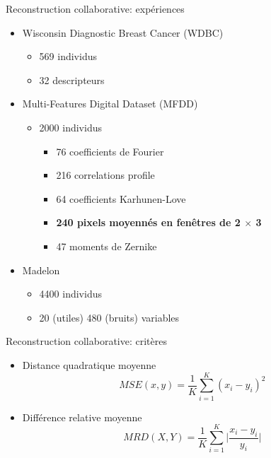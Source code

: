 \documentclass[hyperref={pdfpagelabels=false}]{beamer}
\begin{document}
    \begin{frame}{Reconstruction collaborative: expériences}
        \begin{itemize}
            \item Wisconsin Diagnostic Breast Cancer (WDBC)
                \begin{itemize}
                    \item 569 individus
                    \item 32 descripteurs
                \end{itemize}
            \item Multi-Features Digital Dataset (MFDD)
                \begin{itemize}
                    \item 2000 individus
                    \begin{itemize}
                        \item 76 coefficients de Fourier
                        \item 216 correlations profile
                        \item 64 coefficients Karhunen-Love
                        \item\textbf{240 pixels moyennés en fenêtres de 2 
                            $\times$ 3}
                        \item 47 moments de Zernike
                    \end{itemize}
                \end{itemize}
            \item Madelon
                \begin{itemize}
                    \item 4400 individus
                    \item 20 (utiles) 480 (bruits) variables
                \end{itemize}
        \end{itemize}
    \end{frame}

    \begin{frame}{Reconstruction collaborative: critères}
        \begin{itemize}
            \item Distance quadratique moyenne
                \begin{equation*}
                    MSE(x, y) = \frac{1}{K}\sum_{i = 1}^{K}(x_i - y_i)^2
                \end{equation*}
            \item Différence relative moyenne
                \begin{equation*}
                    MRD(X, Y) = \frac{1}{K}\sum_{i=1}^{K}\Big|\frac{x_i - y_i}{y_i}\Big|
                \end{equation*}
        \end{itemize}
    \end{frame}
\end{document}
